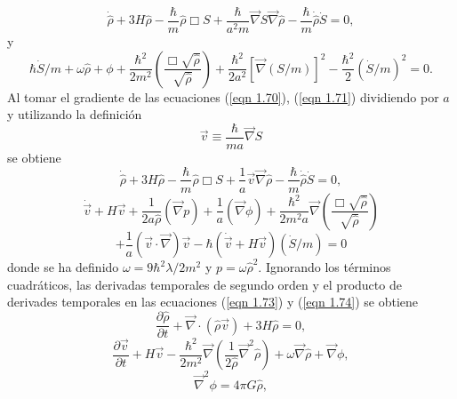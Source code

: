 \documentclass[a4paper,openright,12pt]{book}
\begin{document}
\begin{equation}
\dot{\hat{\rho}} + 3H\hat{\rho}
-\frac{\hbar}{m}\hat{\rho}\Box S 
+\frac{\hbar}{a^{2}m}\vec{\nabla}S\vec{\nabla}\hat{\rho}
-\frac{\hbar}{m}\dot{\hat{\rho}}\dot{S}=0,\label{eqn 1.70}
\end{equation}
y
\begin{equation}
\hbar \dot{S}/m + \omega\hat{\rho}
+ \phi
+ \frac{\hbar^{2}}{2m^{2}}\left(\frac{\Box\sqrt{\hat{\rho}}}{\sqrt{\hat{\rho}}}\right)
+ \frac{\hbar^{2}}{2a^{2}}[\vec{\nabla}(S/m)]^{2}
- \frac{\hbar^{2}}{2}(\dot{S}/m)^{2} = 0.\label{eqn 1.71}
\end{equation}
Al tomar el gradiente de las ecuaciones (\ref{eqn 1.70}), (\ref{eqn 1.71}) dividiendo por $a$ y utilizando la definición 
\begin{equation}
\vec{v}\equiv \frac{\hbar}{ma}\vec{\nabla}S\label{eqn 1.72}
\end{equation}
se obtiene
\begin{equation}
\dot{\hat{\rho}} + 3H\hat{\rho} - \frac{\hbar}{m}\hat{\rho}\Box S 
+ \frac{1}{a}\vec{v}\vec{\nabla}\hat{\rho} - \frac{\hbar}{m}\dot{\hat{\rho}}\dot{S} = 0,\label{eqn 1.73}
\end{equation}
\begin{equation*}
\dot{\vec{v}} + H\vec{v} + \frac{1}{2a\hat{\rho}}(\vec{\nabla}p) 
+ \frac{1}{a}(\vec{\nabla}\phi) + \frac{\hbar^{2}}{2m^{2}a}\vec{\nabla}
\left(\frac{\Box\sqrt{\hat{\rho}}}{\sqrt{\hat{\rho}}}\right) 
\end{equation*}  
\begin{equation}
+\frac{1}{a}(\vec{v}\cdot\vec{\nabla})\vec{v}-\hbar(\dot{\vec{v}}+H\vec{v})(\dot{S}/m) = 0\label{eqn 1.74}
\end{equation}
donde se ha definido $\omega = 9\hbar^{2}\lambda/2m^{2}$ y $p= \omega\hat{ \rho}^{2}$. 
Ignorando los términos cuadráticos, las derivadas temporales de segundo orden y el producto de derivades temporales en las ecuaciones (\ref{eqn 1.73}) y (\ref{eqn 1.74}) se obtiene
\begin{equation}
\frac{\partial \hat{\rho}}{\partial t} +
\vec{\nabla}\cdot(\hat{\rho} \vec{v}) + 3H\hat{\rho}=0,\label{eqn 1.75}
\end{equation}
\begin{equation}
\frac{\partial \vec{v}}{\partial t} + H \vec{v}
-\frac{\hbar^{2}}{2m^{2}}\vec{\nabla}\left(\frac{1}{2\hat{\rho}}\vec{\nabla}^{2}\hat{\rho}\right) + \omega\vec{\nabla}\hat{\rho} +\vec{\nabla}\phi,\label{eqn 1.76}
\end{equation}
\begin{equation}
\vec{\nabla}^{2}\phi = 4\pi G\hat{\rho},\label{eqn 1.77}
\end{equation}
\end{document}
